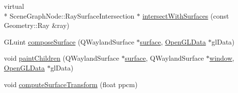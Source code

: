 \begin{DoxyCompactItemize}
virtual \\*
Scene\-Graph\-Node\-::\-Ray\-Surface\-Intersection $\ast$ \hyperlink{classQtwaylandSurfaceNode_a82a9f9f93675df011cfd350a1857ea8b}{intersect\-With\-Surfaces} (const Geometry\-::\-Ray \&ray)
\item 
G\-Luint \hyperlink{classQtwaylandSurfaceNode_a16ad301303ca42fa9a2ad3d1799cf1a2}{compose\-Surface} (Q\-Wayland\-Surface $\ast$\hyperlink{simple-egl_8c_a0720952aa1caded45b5bcdce589663a9}{surface}, \hyperlink{classOpenGLData}{Open\-G\-L\-Data} $\ast$gl\-Data)
\item 
void \hyperlink{classQtwaylandSurfaceNode_a0de0e4cbe5312d91334e091160ac4bce}{paint\-Children} (Q\-Wayland\-Surface $\ast$\hyperlink{simple-egl_8c_a0720952aa1caded45b5bcdce589663a9}{surface}, Q\-Wayland\-Surface $\ast$\hyperlink{structwindow}{window}, \hyperlink{classOpenGLData}{Open\-G\-L\-Data} $\ast$gl\-Data)
\item 
void \hyperlink{classQtwaylandSurfaceNode_a9917572c6241c4a7593b4c9cd9f8c290}{compute\-Surface\-Transform} (float ppcm)
\end{DoxyCompactItemize}


